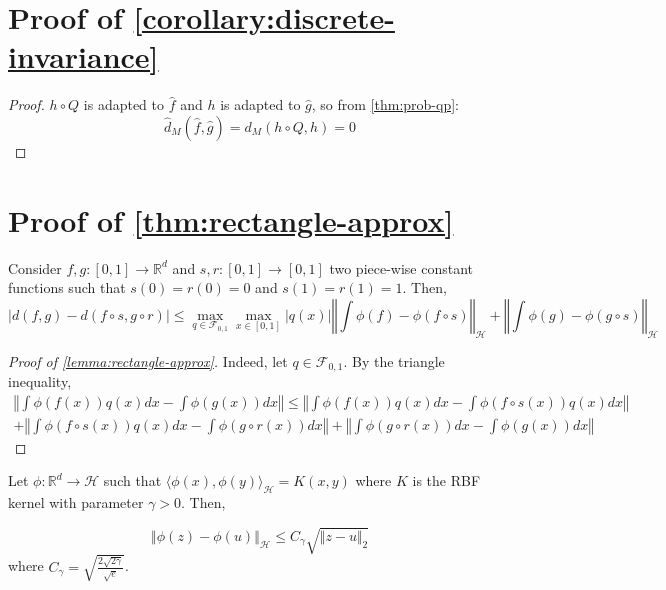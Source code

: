 \section{Proof of \cref{corollary:discrete-invariance}}\label{proof:discrete-invariance}
\begin{proof}
$h \circ Q$ is adapted to $\hat f$ and $h$ is adapted to $\hat g$, so from \cref{thm:prob-qp}:
\begin{equation}
    \hat d_M(\hat f, \hat g) = d_M(h\circ Q, h) = 0
\end{equation}
\end{proof}
\section{Proof of \cref{thm:rectangle-approx}}\label{sec:proof-rectangle-approx}
\begin{lemma}\label{lemma:rectangle-approx}
Consider $f, g:[0, 1] \to \mathbb R^d$ and $s, r:[0,1] \to[0,1]$ two piece-wise constant functions such that $s(0)=r(0)=0$ and $s(1)=r(1)=1$. Then,
\begin{equation}
    \vert d(f, g) - d(f \circ s, g\circ r) \vert \leq \max_{q\in\mathcal F_{0,1}}\max_{x\in[0,1]}\vert q(x) \vert \left\Vert \int \phi(f) - \phi(f\circ s)\right\Vert_{\mathcal H} + \left\Vert \int \phi(g)- \phi(g\circ s)\right\Vert_\mathcal H
\end{equation}

\end{lemma}
\begin{proof}[Proof of \cref{lemma:rectangle-approx}]
Indeed, let $q\in\mathcal F_{0,1}$. By the triangle inequality,
\begin{align}
\left\Vert \int \phi(f(x))q(x)dx - \int \phi(g(x))dx \right\Vert
\leq
\left\Vert \int \phi(f(x))q(x)dx - \int \phi(f\circ s(x))q(x)dx \right\Vert\\
+ \left\Vert \int \phi(f\circ s(x))q(x)dx - \int \phi(g\circ r(x))dx \right\Vert
+ \left\Vert \int \phi(g\circ r(x))dx - \int \phi(g(x))dx \right\Vert
\end{align}
\end{proof}

\begin{lemma}\label{lemma:rbf-lip}
Let $\phi:\mathbb R^d \to \mathcal H$ such that $\langle
\phi(x), \phi(y)\rangle_\mathcal H = K(x, y)$ where $K$ is the RBF kernel with parameter $\gamma > 0$. Then,

\begin{equation}
\left\Vert \phi(z) - \phi(u)\right\Vert_\mathcal H \leq C_\gamma\sqrt{\Vert z - u \Vert_2}
\end{equation}
where $C_\gamma = \sqrt{\frac{2\sqrt{2\gamma}}{\sqrt{e}}}$.
\end{lemma}

